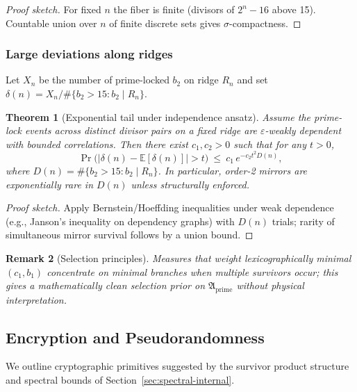 \documentclass[12pt]{article}
\newtheorem{theorem}{Theorem}[section]
\newtheorem{remark}[theorem]{Remark}
\numberwithin{equation}{section}
\begin{document}
\begin{proof}[Proof sketch]
For fixed $n$ the fiber is finite (divisors of $2^n-16$ above 15). Countable union over $n$ of finite discrete sets gives $\sigma$-compactness.
\end{proof}

\subsubsection{Large deviations along ridges}
Let $X_n$ be the number of prime-locked $b_2$ on ridge $R_n$ and set $\delta(n)=X_n/\#\{b_2>15: b_2\mid R_n\}$.

\begin{theorem}[Exponential tail under independence ansatz]\label{thm:ldp}
Assume the prime-lock events across distinct divisor pairs on a fixed ridge are $\varepsilon$-weakly dependent with bounded correlations. Then there exist $c_1,c_2>0$ such that for any $t>0$,
\[
\Pr\big(|\delta(n)-\mathbb{E}[\delta(n)]|>t\big)\ \le\ c_1\, e^{-c_2 t^2 D(n)},
\]
where $D(n)=\#\{b_2>15: b_2\mid R_n\}$. In particular, order-2 mirrors are exponentially rare in $D(n)$ unless structurally enforced.
\end{theorem}

\begin{proof}[Proof sketch]
Apply Bernstein/Hoeffding inequalities under weak dependence (e.g., Janson’s inequality on dependency graphs) with $D(n)$ trials; rarity of simultaneous mirror survival follows by a union bound.
\end{proof}

\begin{remark}[Selection principles]
Measures that weight lexicographically minimal $(c_1,b_1)$ concentrate on minimal branches when multiple survivors occur; this gives a mathematically clean selection prior on $\mathfrak{A}_{\mathrm{prime}}$ without physical interpretation.
\end{remark}

\subsection{Encryption and Pseudorandomness}\label{sec:crypto-bridge}
We outline cryptographic primitives suggested by the survivor product structure and spectral bounds of Section~\ref{sec:spectral-internal}.
\end{document}
